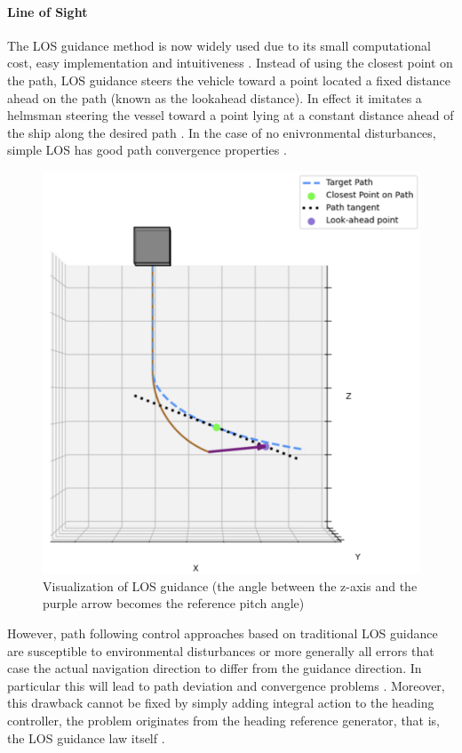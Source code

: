 \paragraph*{Line of Sight}
The LOS guidance method is now widely used due to its small computational cost, easy implementation and intuitiveness \cite{qi_curve_2022} \cite{caharija_integral_2016}. Instead of using the closest point on the path, LOS guidance steers the vehicle toward a point located a fixed distance ahead on the path (known as the lookahead distance). In effect it imitates a helmsman steering the vessel toward a point lying at a constant distance ahead of the ship along the desired path \cite{caharija_integral_2016}. In the case of no enivronmental disturbances, simple LOS has good path convergence properties \cite{borhaug_integral_2008}. 
\begin{figure} [H]
    \centering
    \includegraphics[width=0.7\linewidth]{images/pythonpictures/LOS.png}
    \caption{Visualization of LOS guidance (the angle between the z-axis and the purple arrow becomes the reference pitch angle)}
    \label{fig:LOS}
\end{figure}
However, path following control approaches based on traditional LOS guidance are susceptible to environmental disturbances \cite{borhaug_integral_2008} or more generally all errors that case the actual navigation direction to differ from the guidance direction. In particular this will lead to path deviation and convergence problems \cite{borhaug_integral_2008}. Moreover, this drawback cannot be fixed by simply adding integral action to the heading controller, the problem originates from the heading reference generator, that is, the LOS guidance law itself \cite{borhaug_integral_2008}.

